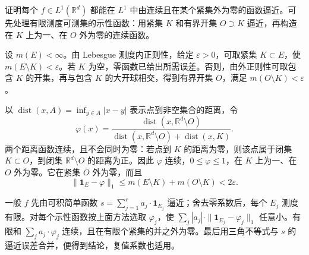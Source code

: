 \begin{exercise}\label{b1:ex:0507}
证明每个 \(f\in L^1(\mathbb R^d)\) 都能在 \(L^1\) 中由连续且在某个紧集外为零的函数逼近。可先处理有限测度可测集的示性函数：用紧集 \(K\) 和有界开集 \(O\supset K\) 逼近，再构造在 \(K\) 上为一、在 \(O\) 外为零的连续函数。
\end{exercise}
\begin{solution}
设 \(m(E)<\infty\)。由 Lebesgue 测度内正则性，给定 \(\varepsilon>0\)，可取紧集 \(K\subset E\)，使 \(m(E\setminus K)<\varepsilon\)。若 \(K\) 为空，零函数已给出所需误差。否则，由外正则性可取包含 \(K\) 的开集，再与包含 \(K\) 的大开球相交，得到有界开集 \(O\)，满足 \(m(O\setminus K)<\varepsilon\)。

以 \(\operatorname{dist}(x,A)=\inf_{y\in A}|x-y|\) 表示点到非空集合的距离，令
\[
\varphi(x)=
\frac{\operatorname{dist}(x,\mathbb R^d\setminus O)}
{\operatorname{dist}(x,\mathbb R^d\setminus O)+\operatorname{dist}(x,K)}.
\]
两个距离函数连续，且不会同时为零：若点到 \(K\) 的距离为零，则该点属于闭集 \(K\subset O\)，到闭集 \(\mathbb R^d\setminus O\) 的距离为正。因此 \(\varphi\) 连续，\(0\leq\varphi\leq1\)，在 \(K\) 上为一、在 \(O\) 外为零。它在紧集 \(\overline O\) 外为零，而且
\[
\|\mathbf1_E-\varphi\|_1\leq m(E\setminus K)+m(O\setminus K)<2\varepsilon.
\]

一般 \(f\) 先由可积简单函数 \(s=\sum_{j=1}^{r}a_j\cdot\mathbf1_{E_j}\) 逼近；舍去零系数后，每个 \(E_j\) 测度有限。对每个示性函数按上面方法选取 \(\varphi_j\)，使
\(\sum_j|a_j|\cdot\|\mathbf1_{E_j}-\varphi_j\|_1\) 任意小。有限和 \(\sum_j a_j\cdot\varphi_j\) 连续，且在有限个紧集的并之外为零。最后用三角不等式与 \(s\) 的逼近误差合并，便得到结论，复值系数也适用。
\end{solution}

